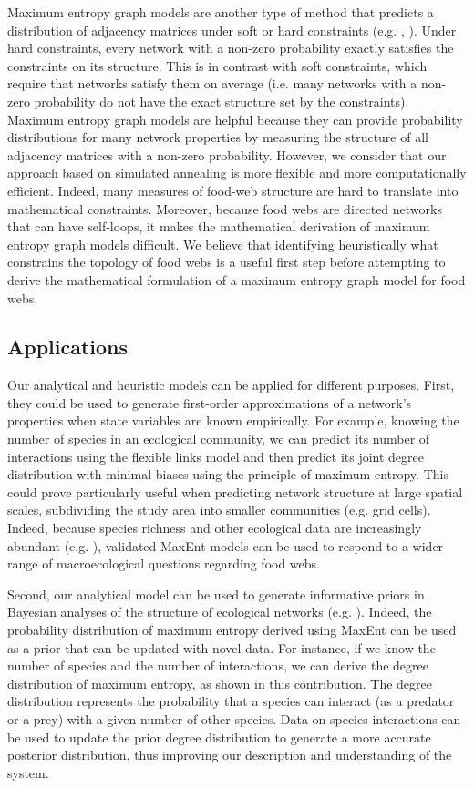 Maximum entropy graph models are another type of method that predicts a
distribution of adjacency matrices under soft or hard constraints (e.g.
\cite{Park2004Statistical}, \cite{Cimini2019Statistical}). Under hard
constraints, every network with a non-zero probability exactly satisfies the
constraints on its structure. This is in contrast with soft constraints, which
require that networks satisfy them on average (i.e. many networks with a
non-zero probability do not have the exact structure set by the constraints).
Maximum entropy graph models are helpful because they can provide probability
distributions for many network properties by measuring the structure of all
adjacency matrices with a non-zero probability. However, we consider that our
approach based on simulated annealing is more flexible and more computationally
efficient. Indeed, many measures of food-web structure are hard to translate
into mathematical constraints. Moreover, because food webs are directed networks
that can have self-loops, it makes the mathematical derivation of maximum
entropy graph models difficult. We believe that identifying heuristically what
constrains the topology of food webs is a useful first step before attempting to
derive the mathematical formulation of a maximum entropy graph model for food
webs. 

\subsection{Applications}

Our analytical and heuristic models can be applied for different purposes.
First, they could be used to generate first-order approximations of a network's
properties when state variables are known empirically. For example, knowing the
number of species in an ecological community, we can predict its number of
interactions using the flexible links model and then predict its joint degree
distribution with minimal biases using the principle of maximum entropy. This
could prove particularly useful when predicting network structure at large
spatial scales, subdividing the study area into smaller communities (e.g. grid
cells). Indeed, because species richness and other ecological data are
increasingly abundant (e.g. \cite{Dickinson2010Citizen}), validated MaxEnt models
can be used to respond to a wider range of macroecological questions regarding
food webs. 

Second, our analytical model can be used to generate informative priors in
Bayesian analyses of the structure of ecological networks (e.g.
\cite{Cirtwill2019Quantitative}). Indeed, the probability distribution of maximum
entropy derived using MaxEnt can be used as a prior that can be updated with
novel data. For instance, if we know the number of species and the number of
interactions, we can derive the degree distribution of maximum entropy, as shown
in this contribution. The degree distribution represents the probability that a
species can interact (as a predator or a prey) with a given number of other
species. Data on species interactions can be used to update the prior degree
distribution to generate a more accurate posterior distribution, thus improving
our description and understanding of the system.

